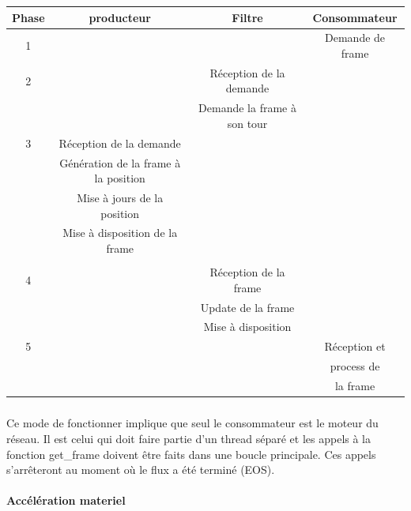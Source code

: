 \begin{center}

  \begin{longtable}{ | c | c | c | c |}

    \hline

Phase & producteur & Filtre & Consommateur    \\ \hline \hline

1 & & & Demande de frame \\ \hline

2 & & Réception de la demande & \\

  & & Demande la frame à son tour & \\ \hline

3 & Réception de la demande & & \\

  & Génération de la frame à la position & & \\

  & Mise à jours de la position & & \\

  & Mise à disposition de la frame & & \\ & & & \\ \hline

4 & & Réception de la frame       & \\

  & & Update de la frame & \\

  & & Mise à disposition & \\ \hline

5 & & & Réception et    \\

  & & & process de      \\

  & & & la frame        \\ \hline

  \end{longtable}

\end{center}

\subparagraph{}

Ce mode de fonctionner implique que seul le consommateur est le moteur
du réseau. Il est celui qui doit faire partie d'un thread séparé
et les appels à la fonction get\_frame doivent être faits dans une
boucle principale.  Ces appels s'arrêteront au moment où le flux a
été terminé (EOS).


\paragraph{Accélération materiel}


